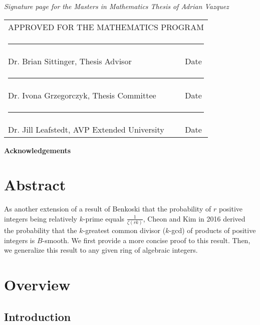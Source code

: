 \documentclass[12pt]{amsart}
\def\name{Adrian Vazquez}
\newcommand{\thesisadvisor}{Dr. Brian Sittinger}
\newcommand{\firstfaculty}{Dr. Ivona Grzegorczyk}
\newcommand{\univefaculty}{Dr. Jill Leafstedt}
\newcommand{\committee}{\vspace*{1.25in} 
\begin{tabular}{ll}
   \multicolumn{2}{c}{\hspace*{2.9cm} APPROVED FOR THE MATHEMATICS PROGRAM}\\[10mm]
   \multicolumn{2}{c}{\hspace*{1.65cm}\rule{4.5in}{.01in}}\\[-4mm]
   \hspace*{3cm}\thesisadvisor, Thesis Advisor \hspace*{0cm}&  Date\\[4mm]
   \multicolumn{2}{c}{\hspace*{1.65cm}\rule{4.5in}{.01in}}\\[-4mm]
   \hspace*{3cm}\firstfaculty, Thesis Committee \hspace*{0cm}&  Date\\[4mm]
   \multicolumn{2}{c}{\hspace*{1.65cm}\rule{4.5in}{.01in}}\\[-4mm]
    \hspace*{3cm}\univefaculty, AVP Extended University \hspace*{0cm}&  Date\\
 \end{tabular}}
\theoremstyle{definition}
\begin{document}
\newpage
 \setlength{\paperheight}{13in}
 \setlength{\topmargin}{1.25cm}

{\center\emph{Signature page for the Masters in Mathematics Thesis of \name}}

\committee


 \newpage
 \setlength{\topmargin}{-0.4375in}
 \setlength{\paperheight}{11.5in}

\newpage

\begin{center}
\vspace*{50mm}
{\bf Acknowledgements}
\end{center}

\newpage

\pagestyle{plain}

\section*{Abstract}
As another extension of a result of Benkoski that the probability of $r$ positive integers being relatively $k$-prime equals $\frac{1}{\zeta(rk)}$, Cheon and Kim in 2016 derived the probability that the $k$-greatest common divisor ($k$-gcd) of products of positive integers is $B$-smooth. We first provide a more concise proof to this result. Then, we generalize this result to any given ring of algebraic integers.

\newpage
\tableofcontents
\newpage
\newpage
{}

\section{Overview}

\subsection{Introduction}
\end{document}
